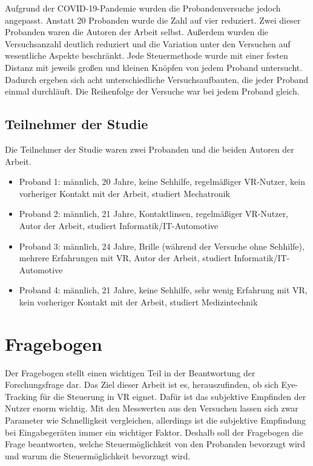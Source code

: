 Aufgrund der \ac{COVID-19}-Pandemie wurden die Probandenversuche jedoch angepasst. Anstatt 20 Probanden wurde die Zahl auf vier reduziert. Zwei dieser Probanden waren die Autoren der Arbeit selbst. Außerdem wurden die Versuchsanzahl deutlich reduziert und die Variation unter den Versuchen auf wesentliche Aspekte beschränkt. Jede Steuermethode wurde mit einer festen Distanz mit jeweils großen und kleinen Knöpfen von jedem Proband untersucht. Dadurch ergeben sich acht unterschiedliche Versuchsaufbauten, die jeder Proband einmal durchläuft. Die Reihenfolge der Versuche war bei jedem Proband gleich. 

\subsection{Teilnehmer der Studie}
Die Teilnehmer der Studie waren zwei Probanden und die beiden Autoren der Arbeit.
\begin{itemize}
	\item Proband 1: männlich, 20 Jahre, keine Sehhilfe, regelmäßiger VR-Nutzer, kein vorheriger Kontakt mit der Arbeit, studiert Mechatronik
	\item Proband 2: männlich, 21 Jahre, Kontaktlinsen, regelmäßiger VR-Nutzer, Autor der Arbeit, studiert Informatik/IT-Automotive
	\item Proband 3: männlich, 24 Jahre, Brille (während der Versuche ohne Sehhilfe), mehrere Erfahrungen mit VR, Autor der Arbeit, studiert Informatik/IT-Automotive
	\item Proband 4: männlich, 21 Jahre, keine Sehhilfe, sehr wenig Erfahrung mit VR, kein vorheriger Kontakt mit der Arbeit, studiert Medizintechnik
\end{itemize}

\section{Fragebogen} 
\label{section:fragebogen}
Der Fragebogen stellt einen wichtigen Teil in der Beantwortung der Forschungsfrage dar. Das Ziel dieser Arbeit ist es, herauszufinden, ob sich Eye-Tracking für die Steuerung in VR eignet. Dafür ist das subjektive Empfinden der Nutzer enorm wichtig. Mit den Messwerten aus den Versuchen lassen sich zwar Parameter wie Schnelligkeit vergleichen, allerdings ist die subjektive Empfindung bei Eingabegeräten immer ein wichtiger Faktor. Deshalb soll der Fragebogen die Frage beantworten, welche Steuermöglichkeit von den Probanden bevorzugt wird und warum die Steuermöglichkeit bevorzugt wird.
